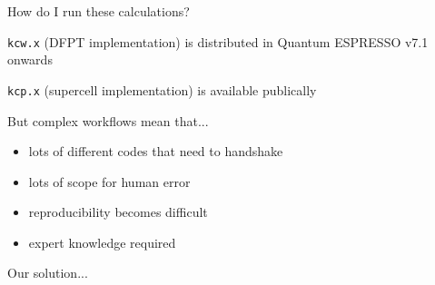 \documentclass[xcolor=table,aspectratio=169]{beamer}
\numberwithin{equation}{section}
\begin{document}
\begin{frame}{How do I run these calculations?}

   \texttt{kcw.x} (DFPT implementation) is distributed in Quantum ESPRESSO v7.1 onwards

   \vspace{2ex}

   \texttt{kcp.x} (supercell implementation) is available publically

   \vspace{4ex}

   But complex workflows mean that...
   \begin{itemize}
      \item lots of different codes that need to handshake
      \item lots of scope for human error
      \item reproducibility becomes difficult
      \item expert knowledge required
   \end{itemize}

   Our solution...

\end{frame}
\end{document}
